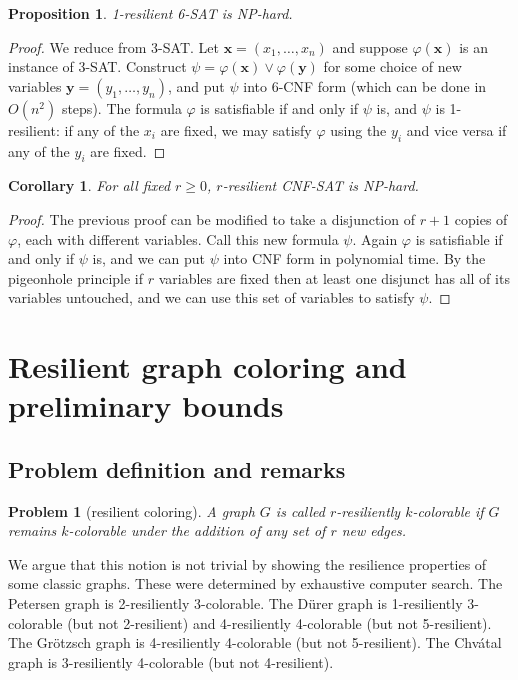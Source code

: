 \documentclass{llncs}
\newtheorem{cor}{Corollary}
\newtheorem{propn}{Proposition}
\newtheorem{prob}{Problem}
\begin{document}
\begin{propn}
1-resilient 6-SAT is NP-hard.
\end{propn}
\begin{proof}
We reduce from 3-SAT. Let $\mathbf{x} = (x_1, \dots, x_n)$ and suppose
$\varphi(\mathbf{x})$ is an instance of 3-SAT.  Construct $\psi =
\varphi(\mathbf{x}) \vee \varphi(\mathbf{y})$ for some choice of new variables
$\mathbf{y} = (y_1, \dots, y_n)$, and put $\psi$ into 6-CNF form (which can be done in $O(n^2)$
steps). The formula $\varphi$ is satisfiable if and only if $\psi$ is, and
$\psi$ is 1-resilient: if any of the $x_i$ are fixed, we may satisfy $\varphi$
using the $y_i$ and vice versa if any of the $y_i$ are fixed.  
\end{proof}

\begin{cor}
For all fixed $r \geq 0$, $r$-resilient CNF-SAT is NP-hard.
\end{cor}
\begin{proof}
The previous proof can be modified to take a disjunction of $r+1$ copies of
$\varphi$, each with different variables. Call this new formula $\psi$.
Again $\varphi$ is satisfiable if and only if $\psi$ is, and we can put $\psi$
into CNF form in polynomial time. By the pigeonhole principle if $r$ variables
are fixed then at least one disjunct has all of its variables untouched, and we
can use this set of variables to satisfy $\psi$.  \end{proof}

\section{Resilient graph coloring and preliminary bounds}
\label{sec:resilient-coloring-obs-bounds}
\subsection{Problem definition and remarks}

\begin{prob}[resilient coloring] 
A graph $G$ is called \emph{$r$-resiliently $k$-colorable} if $G$ remains
$k$-colorable under the addition of any set of $r$ new edges.
\end{prob}

We argue that this notion is not trivial by showing the resilience properties
of some classic graphs. These were determined by exhaustive computer search.
The Petersen graph is 2-resiliently 3-colorable. The D{\"u}rer graph is
1-resiliently 3-colorable (but not 2-resilient) and 4-resiliently 4-colorable
(but not 5-resilient). The Gr{\"o}tzsch graph is 4-resiliently 4-colorable (but
not 5-resilient). The Chv{\'a}tal graph is 3-resiliently 4-colorable (but not
4-resilient).
\end{document}
